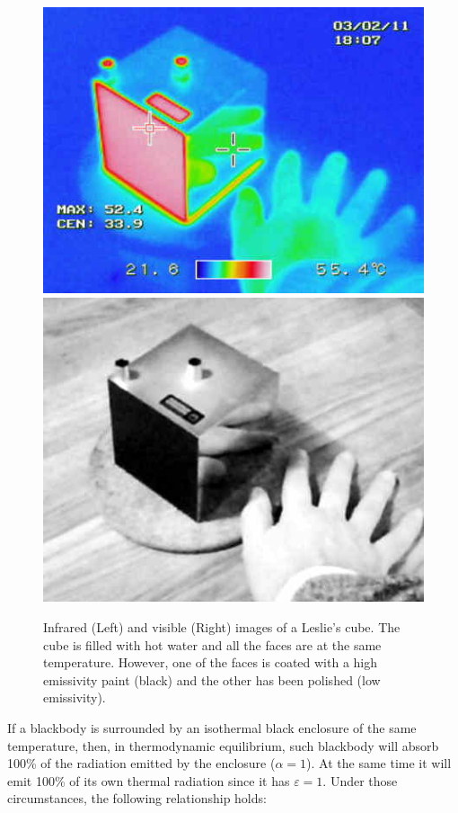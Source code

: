 		\begin{figure}[ht!]
			\centering
			\captionsetup{justification=centering,margin=2cm}
			\includegraphics[scale=0.55]{Figures/Chapter01/LesliesCube.jpg}
			\includegraphics[scale=0.52]{Figures/Chapter01/LesliesCube2.jpg}
			\caption{Infrared (Left) and visible (Right) images of a Leslie’s cube. The cube is filled with hot water and all the faces are at the same temperature. However,  one of the faces is coated with a high emissivity paint (black) and the other has been polished (low emissivity).}\label{fig1.5}
		\end{figure}
		
		If a blackbody is surrounded by an isothermal black enclosure of the same temperature, then, in thermodynamic equilibrium, such blackbody will absorb 100\% of the radiation emitted by the enclosure ($\alpha=1$). At the same time it will emit 100\% of its own thermal radiation since it has $\varepsilon=1$. Under those circumstances, the following relationship holds:
		
